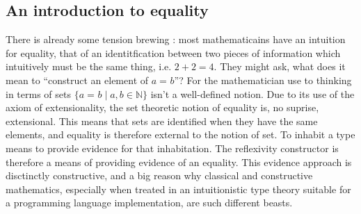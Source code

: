 \documentclass[11pt, a4paper]{article}
\newcommand{\id}[3][]{\ensuremath{#2 =_{#1} #3}\xspace}
\begin{document}
\begin{code}[hide]%
\>[0]\<%
\\
\>[0]\AgdaSpace{}%
\AgdaSpace{}%
\<%
\\
\>[0]\<%
\end{code}
\begin{code}%
\>[0]\<%
\\
\>[0][@{}l@{\AgdaIndent{1}}]%
\>[2]\AgdaSpace{}%
\AgdaSpace{}%
\AgdaSymbol{\{}\AgdaSpace{}%
\AgdaSymbol{:}\AgdaSpace{}%
\AgdaSymbol{\}}\AgdaSpace{}%
\AgdaSymbol{:}\AgdaSpace{}%
\AgdaSymbol{(}\AgdaSpace{}%
\AgdaSpace{}%
\AgdaSymbol{:}\AgdaSpace{}%
\AgdaSymbol{)}\AgdaSpace{}%
\AgdaSpace{}%
\AgdaSpace{}%
\<%
\\
\>[2][@{}l@{\AgdaIndent{0}}]%
\>[4]\AgdaSpace{}%
\AgdaSymbol{:}\AgdaSpace{}%
\AgdaSymbol{(}\AgdaSpace{}%
\AgdaSymbol{:}\AgdaSpace{}%
\AgdaSymbol{)}\AgdaSpace{}%
\AgdaSpace{}%
\AgdaSpace{}%
\AgdaSpace{}%
\<%
\\
\>[0]\<%
\end{code}

\subsection{An introduction to equality}

There is already some tension brewing : most mathematicains have an intuition
for equality, that of an identitfication between two pieces of information
which intuitively must be the same thing, i.e. $2+2=4$. They might ask, what
does it mean to ``construct an element of $\id{a}{b}$''? For the mathematician
use to thinking in terms of sets $\{\id{a}{b} \mid a,b \in \mathbb{N} \}$ isn't
a well-defined notion. Due to its use of the axiom of extensionality, the set
theoretic notion of equality is, no suprise, extensional.  This means that sets
are identified when they have the same elements, and equality is therefore
external to the notion of set. To inhabit a type means to provide evidence for
that inhabitation. The reflexivity constructor is therefore a means of
providing evidence of an equality. This evidence approach is disctinctly
constructive, and a big reason why classical and constructive mathematics,
especially when treated in an intuitionistic type theory suitable for a
programming language implementation, are such different beasts.
\end{document}
